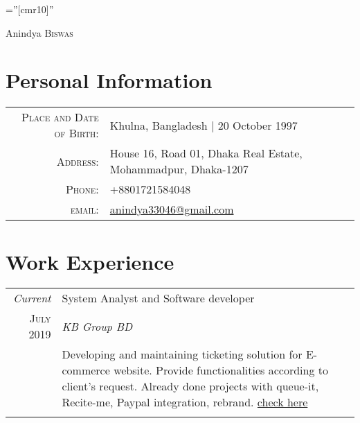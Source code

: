 \documentclass[a4paper,10pt]{article}
\begin{document}

\pagestyle{empty} %

\font\fb=''[cmr10]'' %

\par{\centering
		{\Huge Anindya \textsc{Biswas}
	}\bigskip\par}

\section{Personal Information}

\begin{tabular}{rl}
    \textsc{Place and Date of Birth:} & Khulna, Bangladesh  | 20 October 1997 \\
    \textsc{Address:}   & House 16, Road 01, Dhaka Real Estate, Mohammadpur, Dhaka-1207 \\
    \textsc{Phone:}     & +8801721584048\\
    \textsc{email:}     &  \href{mailto:anindya33046@email.com}{anindya33046@gmail.com}
\end{tabular}

\section{Work Experience}
\begin{tabular}{r|p{11cm}}
 \emph{Current} & System Analyst and Software developer \textsc{}  \\\textsc{July 2019}&\emph{KB Group BD}\\&\footnotesize{Developing and maintaining ticketing solution for E-commerce website. Provide functionalities according to client's request. Already done projects with queue-it, Recite-me, Paypal integration, rebrand. \href{https://tickets.delfontmackintosh.co.uk/continueshopping.asp}{check here}
 }\\\multicolumn{2}{c}{} \\

\end{tabular}
\end{document}
